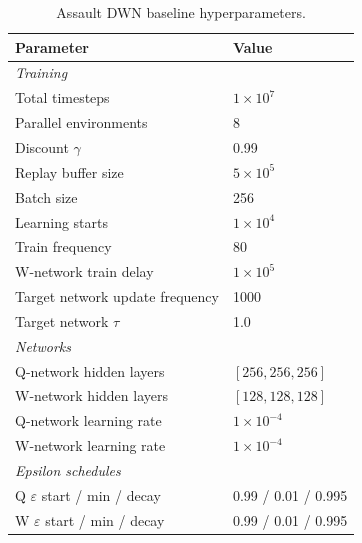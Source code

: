\begin{table}[h]
\centering
\begin{tabular}{ll}
\toprule
Parameter & Value \\
\midrule
\multicolumn{2}{l}{\textit{Training}} \\
Total timesteps & $1 \times 10^{7}$ \\
Parallel environments & 8 \\
Discount $\gamma$ & 0.99 \\
Replay buffer size & $5 \times 10^{5}$ \\
Batch size & 256 \\
Learning starts & $1 \times 10^{4}$ \\
Train frequency & 80 \\
W-network train delay & $1 \times 10^{5}$ \\
Target network update frequency & 1000 \\
Target network $\tau$ & 1.0 \\
\midrule
\multicolumn{2}{l}{\textit{Networks}} \\
Q-network hidden layers & $[256, 256, 256]$ \\
W-network hidden layers & $[128, 128, 128]$ \\
Q-network learning rate & $1 \times 10^{-4}$ \\
W-network learning rate & $1 \times 10^{-4}$ \\
\midrule
\multicolumn{2}{l}{\textit{Epsilon schedules}} \\
Q $\varepsilon$ start / min / decay & 0.99 / 0.01 / 0.995 \\
W $\varepsilon$ start / min / decay & 0.99 / 0.01 / 0.995 \\
\bottomrule
\end{tabular}
\caption{Assault DWN baseline hyperparameters.}
\end{table}
